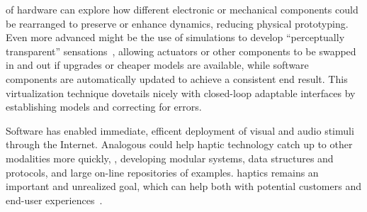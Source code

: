     
     of hardware can explore how different electronic or mechanical components could be rearranged to preserve or enhance dynamics, reducing physical prototyping.
    Even more advanced might be the use of simulations to develop ``perceptually transparent'' sensations~\citep{Ryu2007}, allowing actuators or other components to be swapped in and out if upgrades or cheaper models are available, while software components are automatically updated to achieve a consistent end result. 
    This virtualization technique dovetails nicely with closed-loop adaptable interfaces by establishing models and correcting for errors.
    
    Software has enabled immediate, efficent deployment of visual and audio stimuli through the Internet.
    Analogous  could help haptic technology catch up to other modalities more quickly, \eg,
    developing modular systems, data structures and protocols, and large on-line repositories of examples.
     haptics  remains an important and unrealized goal, which can help both with potential customers and end-user experiences~\citep{Modhrain2001}.
    
    
